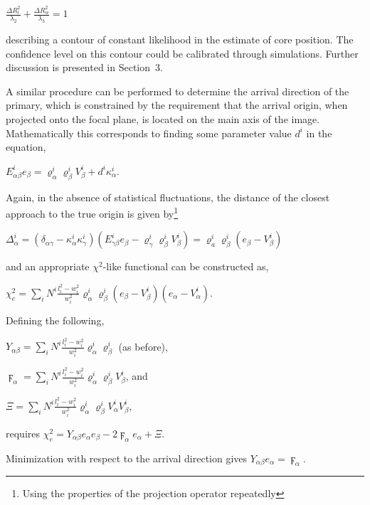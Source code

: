 \documentclass[letterpaper]{article}
\begin{document}
$\displaystyle 
\frac{\Delta R_l^2}{\lambda_2}  + \frac{\Delta R_w^2}{\lambda_3} = 1$

describing a contour of constant likelihood in the estimate of core
position. The confidence level on this contour could be calibrated
through simulations. Further discussion is presented in Section~3.

A similar procedure can be performed to determine the arrival
direction of the primary, which is constrained by the requirement that
the arrival origin, when projected onto the focal plane, is located on
the main axis of the image. Mathematically this corresponds to finding
some parameter value $d^{i}$ in the equation,

$\displaystyle E_{\alpha\beta}^{i}e_{\beta}=\varrho_{\alpha}^{i}\varrho_{\beta
}^{i}V_{\beta}^{i}+d^{i}\kappa_{\alpha}^{i}$.

Again, in the absence of statistical fluctuations, the distance of the
closest approach to the true origin is given 
by\footnote{Using the properties of the projection operator repeatedly}

$\displaystyle \Delta_{\alpha}^i=\left(\delta_{\alpha\gamma}
-\kappa_{\alpha}^{i}\kappa_{\gamma}^{i}\right)
\left(E_{\gamma\beta}^{i}e_{\beta}
-\varrho_{\gamma}^{i}\varrho_{\beta}^{i}V_{\beta}^{i}\right)
=\varrho_{a}^{i}\varrho_{\beta}^{i}\left(e_{\beta}-V_{\beta}^{i}\right)$

and an appropriate $\chi^{2}$-like functional can be constructed as,

$\displaystyle \chi_{e}^{2}
=\sum\limits_{i}N^{i}\frac{l_{i}^{2}-w_{i}^{2}}{w_{i}^{2}}
\varrho_{\alpha}^{i}\varrho_{\beta}^{i}\left(e_{\beta}-V_{\beta}^{i}\right)
\left(e_{\alpha}-V_{\alpha}^{i}\right)$.

Defining the following,

$\displaystyle Y_{\alpha\beta}=\sum\limits_{i}N^{i}\frac{l_{i}^{2}
-w_{i}^{2}}{w_{i}^{2}}\varrho_{\alpha}^{i}\varrho_{\beta}^{i}$
(as before),

$\displaystyle \digamma_{\alpha}=\sum\limits_{i}N^{i}\frac{l_{i}^{2}
-w_{i}^{2}}{w_{i}^{2}}\varrho_{\alpha}^{i}\varrho_{\beta}^{i}V_{\beta}^{i}$,
and

$\displaystyle \Xi=\sum\limits_{i}N^{i}\frac{l_{i}^{2}-w_{i}^{2}}{w_{i}^{2}}
\varrho_{\alpha}^{i}\varrho_{\beta}^{i}V_{\alpha}^{i}V_{\beta}^{i}$,

requires $\chi_e^{2}
=Y_{\alpha\beta}e_{\alpha}e_{\beta}-2\digamma_{\alpha}e_{\alpha}+\Xi$.

Minimization with respect to the arrival direction gives
$\displaystyle Y_{\alpha\beta}e_{\alpha}=\digamma_{\alpha }$.
\end{document}
